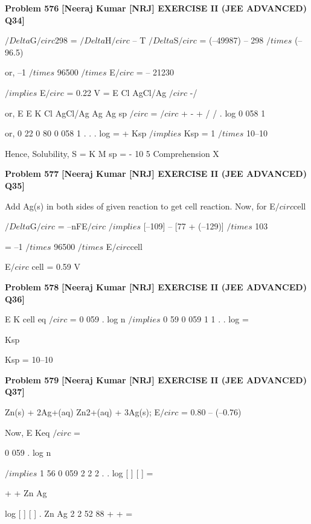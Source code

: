 \begin{problembox}
\textbf{Problem 576} \hfill \textbf{[Neeraj Kumar [NRJ] EXERCISE II (JEE ADVANCED) Q34]}
\label{q:ext-nrj_all_questions-576}

$/Delta$G$/circ$298 = $/Delta$H$/circ$ -- T   $/Delta$S$/circ$ = (--49987) -- 298 $/times$ (--96.5)
 
 or, --1 $/times$ 96500 $/times$ E$/circ$ = -- 21230
 
  $/implies$ E$/circ$ = 0.22 V = E Cl
AgCl/Ag
$/circ$
-/
 
 or, E
E
K
Cl
AgCl/Ag
Ag
Ag
sp
$/circ$
=
$/circ$
+
-
+
/
/
.
log
0 058
1
 
 or, 0 22
0 80
0 058
1
.
.
.
log
=
+
Ksp $/implies$ Ksp = 1 $/times$ 10--10
 
 Hence, Solubility, S = 
K
M
sp =
-
10 5
Comprehension X
\end{problembox}

\begin{problembox}
\textbf{Problem 577} \hfill \textbf{[Neeraj Kumar [NRJ] EXERCISE II (JEE ADVANCED) Q35]}
\label{q:ext-nrj_all_questions-577}

Add Ag(s) in both sides of given reaction to get 
cell reaction. Now, for E$/circ$cell
 
 $/Delta$G$/circ$ = --nFE$/circ$ $/implies$ [--109] -- [77 + (--129)] $/times$ 103
 
 
           = --1 $/times$ 96500 $/times$ E$/circ$cell
 
   E$/circ$ cell = 0.59 V
\end{problembox}

\begin{problembox}
\textbf{Problem 578} \hfill \textbf{[Neeraj Kumar [NRJ] EXERCISE II (JEE ADVANCED) Q36]}
\label{q:ext-nrj_all_questions-578}

E
K
cell
eq
$/circ$
= 0 059
.
log
n
 $/implies$ 0 59
0 059
1
1
.
.
log
=
 
Ksp
 
   Ksp = 10--10
\end{problembox}

\begin{problembox}
\textbf{Problem 579} \hfill \textbf{[Neeraj Kumar [NRJ] EXERCISE II (JEE ADVANCED) Q37]}
\label{q:ext-nrj_all_questions-579}

Zn(s) + 2Ag+(aq)   Zn2+(aq) + 3Ag(s); E$/circ$ = 0.80 -- 
(--0.76)
 
 Now, E
Keq
$/circ$ =
 
0 059
.
log
n
 
 
 $/implies$ 1 56
0 059
2
2
2
.
.
log [
]
[
]
=
 
+
+
Zn
Ag
 
   log [
]
[
]
.
Zn
Ag
2
2
52 88
+
+
=
\end{problembox}

